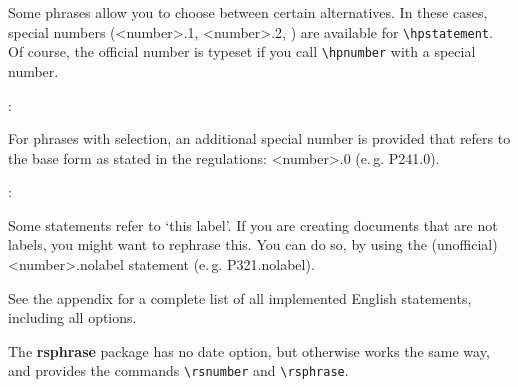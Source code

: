 \documentclass[a4paper,notitlepage,parskip=half]{scrreprt}
\begin{document}
\noindent Some phrases allow you to choose between certain alternatives.
In these cases, special numbers (<number>.1, <number>.2, \textellipsis) are available for \verb|\hpstatement|.
Of course, the official number is typeset if you call \verb|\hpnumber| with a special number.
\bigskip

\begin{addmargin}[1em]{0em}
\begin{SideBySideExample}[xrightmargin=7cm]
  :
  \hpstatement{}
\end{SideBySideExample}
\end{addmargin}
\bigskip

\noindent For phrases with selection, an additional special number is provided that refers to the base form as stated in the regulations: <number>.0 (e.\,g. P241.0).
\bigskip

\begin{addmargin}[1em]{0em}
\begin{SideBySideExample}[xrightmargin=7cm]
  :
  \hpstatement{}
\end{SideBySideExample}
\end{addmargin}
\bigskip

\noindent Some statements refer to `this label'.
If you are creating documents that are not labels, you might want to rephrase this.
You can do so, by using the (unofficial) <number>.nolabel statement (e.\,g. P321.nolabel).
\bigskip

See the appendix for a complete list of all implemented English statements, including all options.

\bigskip

\noindent The \textbf{rsphrase} package has no date option, but otherwise works the same way, and provides the commands \verb|\rsnumber| and \verb|\rsphrase|.

\bigskip
\end{document}
